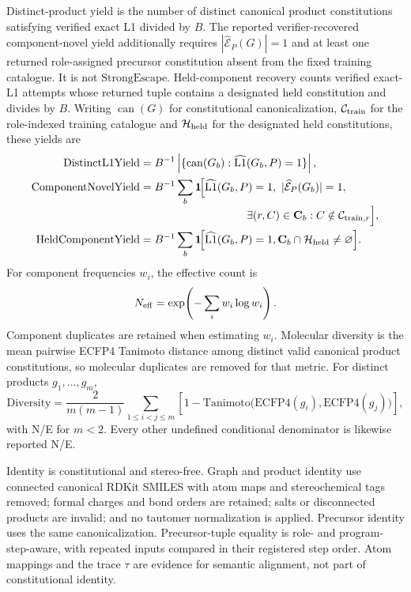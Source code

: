 \documentclass{article}
\begin{document}
Distinct-product yield is the number of distinct canonical product constitutions satisfying verified
exact L1 divided by $B$. The reported verifier-recovered component-novel yield additionally requires
$|\widehat{\mathcal E}_P(G)|=1$ and at least one returned role-assigned precursor constitution absent
from the fixed training catalogue. It is not $\mathrm{StrongEscape}$. Held-component recovery counts
verified exact-L1 attempts whose returned tuple contains a designated held constitution and divides
by $B$.
Writing $\operatorname{can}(G)$ for constitutional canonicalization, $\mathcal C_{\rm train}$ for
the role-indexed training catalogue and $\mathcal H_{\rm held}$ for the designated held
constitutions, these yields are
\begin{align}
 \mathrm{DistinctL1Yield}
 &=B^{-1}\left|\{\operatorname{can}(G_b):\widehat{\mathrm{L1}}(G_b,P)=1\}\right|,\\
 \mathrm{ComponentNovelYield}
 &=B^{-1}\sum_b\mathbf 1\!\Bigl[
 \widehat{\mathrm{L1}}(G_b,P)=1,\ |\widehat{\mathcal E}_P(G_b)|=1,\notag\\[-1mm]
 &\hspace{34mm}\exists (r,C)\in\mathbf C_b:
 C\notin\mathcal C_{{\rm train},r}\Bigr],\\
 \mathrm{HeldComponentYield}
 &=B^{-1}\sum_b\mathbf 1\!\Bigl[
 \widehat{\mathrm{L1}}(G_b,P)=1,
 \mathbf C_b\cap\mathcal H_{\rm held}\neq\varnothing\Bigr].
\end{align}
For component frequencies $w_i$, the effective count is
\begin{equation}
 N_{\rm eff}=\exp\!\left(-\sum_i w_i\log w_i\right).
\end{equation}
Component duplicates are retained when estimating $w_i$. Molecular diversity is the mean pairwise
ECFP4 Tanimoto distance among distinct valid canonical product constitutions, so molecular duplicates
are removed for that metric. For distinct products $g_1,\ldots,g_m$,
\begin{equation}
 \mathrm{Diversity}=
 \frac{2}{m(m-1)}\sum_{1\leq i<j\leq m}
 \left[1-\mathrm{Tanimoto}\bigl(\mathrm{ECFP4}(g_i),\mathrm{ECFP4}(g_j)\bigr)\right],
\end{equation}
with N/E for $m<2$. Every other undefined conditional denominator is likewise reported N/E.

Identity is constitutional and stereo-free. Graph and product identity use connected canonical RDKit
SMILES with atom maps and stereochemical tags removed; formal charges and bond orders are retained;
salts or disconnected products are invalid; and no tautomer normalization is applied. Precursor
identity uses the same canonicalization. Precursor-tuple equality is role- and program-step-aware,
with repeated inputs compared in their registered step order. Atom mappings and the trace $\tau$ are
evidence for semantic alignment, not part of constitutional identity.
\end{document}
